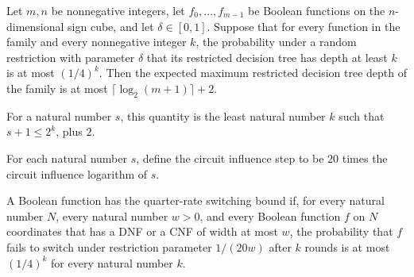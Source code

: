 \begin{theorem}
\label{FABL.expect_maxRestrictedDecisionTreeDepth_le_clog_add_two_of_failure_le_quarter}
\leanok
{}
Let $m,n$ be nonnegative integers, let $f_0,\ldots,f_{m-1}$ be Boolean functions on the
$n$-dimensional sign cube, and let $\delta\in[0,1]$. Suppose that for every function in
the family and every nonnegative integer $k$, the probability under a random restriction
with parameter $\delta$ that its restricted decision tree has depth at least $k$ is at
most $(1/4)^k$. Then the expected maximum restricted decision tree depth of the family
is at most $\lceil\log_2(m+1)\rceil+2$.
\end{theorem}

\begin{definition}
\label{FABL.circuitInfluenceLog}
\leanok
For a natural number $s$, this quantity is the least natural number $k$ such that
$s+1\le 2^k$, plus $2$.
\end{definition}

\begin{definition}
\label{FABL.circuitInfluenceStep}
\leanok
{}
For each natural number $s$, define the circuit influence step to be $20$ times the
circuit influence logarithm of $s$.
\end{definition}

\begin{definition}
\label{FABL.HasQuarterSwitchingBound}
\leanok
{}
A Boolean function has the quarter-rate switching bound if, for every natural number
$N$, every natural number $w>0$, and every Boolean function $f$ on $N$ coordinates that
has a DNF or a CNF of width at most $w$, the probability that $f$ fails to switch under
restriction parameter $1/(20w)$ after $k$ rounds is at most $(1/4)^k$ for every natural
number $k$.
\end{definition}

